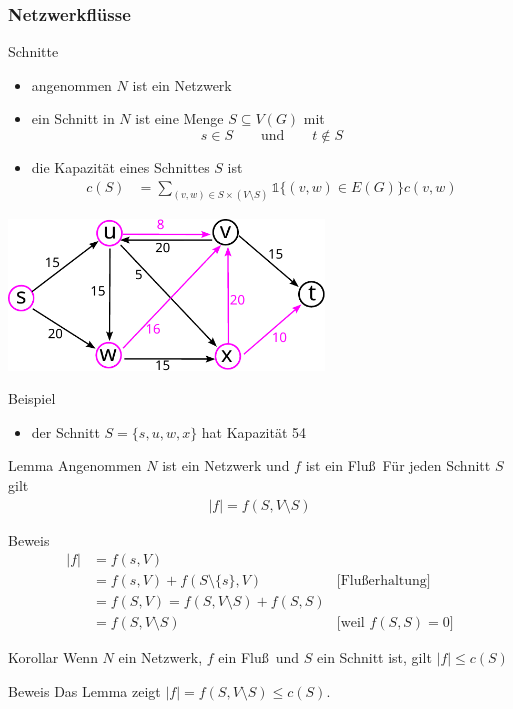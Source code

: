 \documentclass[aspectratio=1610, 11pt]{beamer}
\newcommand{\vecone}{\mathbb{1}}
\newcommand{\mytitle}{Netzwerkfl\"usse}
\begin{document}
\begin{frame}\frametitle{\mytitle}
	\begin{overprint}
		\begin{exampleblock}{Schnitte}
			\begin{itemize}
				\item angenommen $N$ ist ein Netzwerk
				\item ein \alert{Schnitt} in $N$ ist eine Menge $S\subseteq V(G)$ mit
					$$s\in S\qquad\mbox{und}\qquad t\not\in S$$
				\item die \alert{Kapazit\"at} eines Schnittes $S$ ist
					\begin{align*}
						c(S)&=\sum_{(v,w)\in S\times (V\setminus S)}\vecone\{(v,w)\in E(G)\}c(v,w)
					\end{align*}
			\end{itemize}
		\end{exampleblock}
		\hfill\includegraphics[height=40mm]{./images/flow17.pdf}
		\begin{exampleblock}{Beispiel}
			\begin{itemize}
				\item der Schnitt $S=\{s,u,w,x\}$ hat Kapazit\"at 54
			\end{itemize}
		\end{exampleblock}
		\begin{block}{Lemma}
			Angenommen $N$ ist ein Netzwerk und $f$ ist ein Flu\ss\
			F\"ur jeden Schnitt $S$ gilt
			\begin{align*}
|f|=f(S,V\setminus S)
			\end{align*}
		\end{block}
		\begin{exampleblock}{Beweis}
			\vspace*{-4mm}
			\begin{align*}
				|f|&=f(s,V)\\
				   &=f(s,V)+f(S\setminus\{s\},V)&\mbox{[Flu\ss erhaltung]}\\
				   &=f(S,V)=f(S,V\setminus S)+f(S,S)\\
				   &=f(S,V\setminus S)&\mbox{[weil $f(S,S)=0$]}
			\end{align*}
		\end{exampleblock}
		\begin{block}{Korollar}
			Wenn $N$ ein Netzwerk, $f$ ein Flu\ss\ und $S$ ein Schnitt ist, gilt $|f|\leq c(S)$
		\end{block}
		\begin{exampleblock}{Beweis}
			Das Lemma zeigt $|f|=f(S,V\setminus S)\leq c(S)$.
		\end{exampleblock}
	\end{overprint}
\end{frame}
\end{document}

